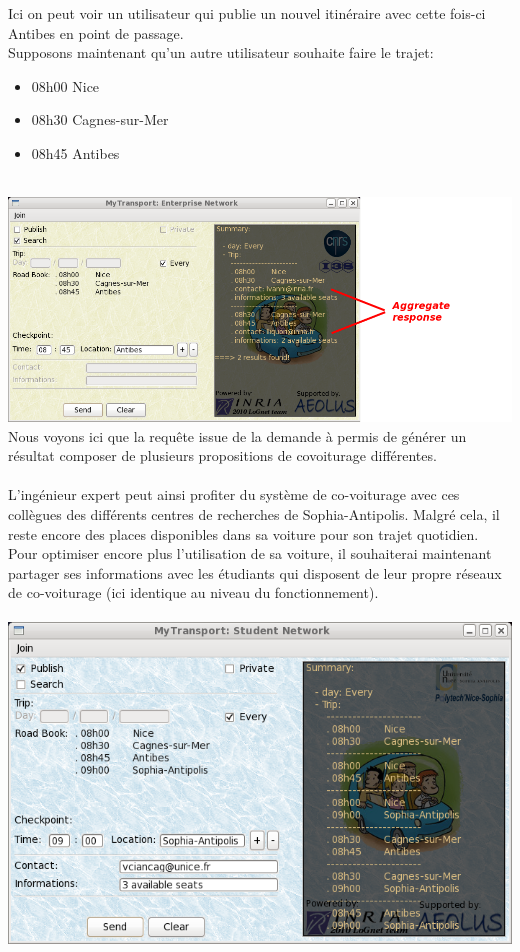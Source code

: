 Ici on peut voir un utilisateur qui publie un nouvel itinéraire avec cette fois-ci Antibes en point de passage.\\

Supposons maintenant qu'un autre utilisateur souhaite faire le trajet:
\begin{itemize}
\item 08h00 Nice
\item 08h30 Cagnes-sur-Mer
\item 08h45 Antibes \\
\end{itemize}

~ \includegraphics[scale=0.50]{img/screenshot/NiceCagnesAntibesSub}\\

Nous voyons ici que la requête issue de la demande à permis de générer un résultat composer de plusieurs propositions de covoiturage différentes.\\ ~ \\

L'ingénieur expert peut ainsi profiter du système de co-voiturage avec ces collègues des différents centres de recherches de Sophia-Antipolis. Malgré cela, il reste encore des places disponibles dans sa voiture pour son trajet quotidien. Pour optimiser encore plus l'utilisation de sa voiture, il souhaiterai maintenant partager ses informations avec les étudiants qui disposent de leur propre réseaux de co-voiturage (ici identique au niveau du fonctionnement).\\

~ \includegraphics[scale=0.55]{img/screenshot/NiceCagnesAbtibesSophiaPub_studentNetwork}\\

